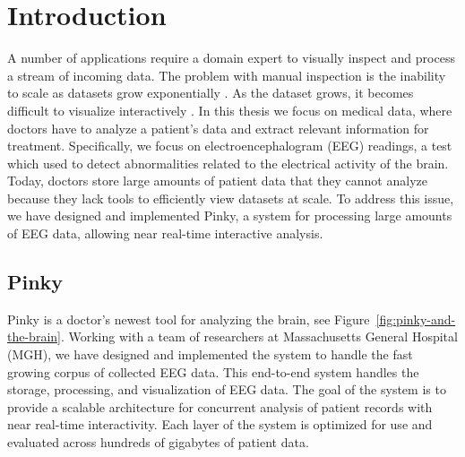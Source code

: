 \chapter{Introduction}\label{intro-ch}

A number of applications require a domain expert to visually inspect and
process a stream of incoming data. The problem with manual inspection is the
inability to scale as datasets grow exponentially \cite{exp-growth}. As the
dataset grows, it becomes difficult to visualize interactively \cite{immens}.
In this thesis we focus on medical data, where doctors have to analyze a
patient's data and extract relevant information for treatment. Specifically, we
focus on electroencephalogram (EEG) readings, a test which used to detect
abnormalities related to the electrical activity of the brain. \\

Today, doctors store large amounts of patient data that they cannot analyze
because they lack tools to efficiently view datasets at scale. To address this
issue, we have designed and implemented Pinky, a system for processing large
amounts of EEG data, allowing near real-time interactive analysis.


\section{Pinky}

Pinky is a doctor's newest tool for analyzing the brain, see
Figure~\ref{fig:pinky-and-the-brain}. Working with a team of researchers at
Massachusetts General Hospital (MGH), we have designed and implemented the
system to handle the fast growing corpus of collected EEG data. This end-to-end
system handles the storage, processing, and visualization of EEG data. The
goal of the system is to provide a scalable architecture for concurrent
analysis of patient records with near real-time interactivity. Each layer of
the system is optimized for use and evaluated across hundreds of gigabytes of
patient data. \\


